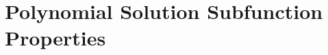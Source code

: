 \documentclass[11pt]{article}
\begin{document}



\newpage

\section{Polynomial Solution Subfunction Properties}
\end{document}
